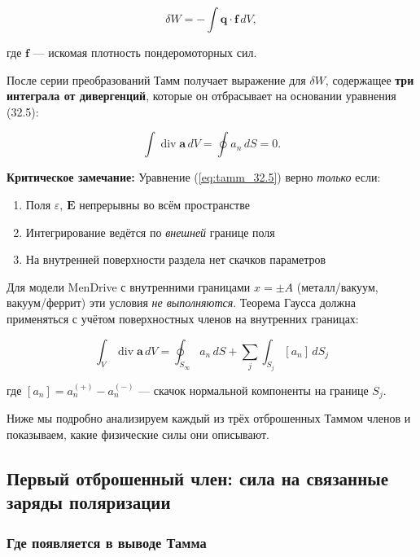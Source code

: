 \documentclass[a4paper,12pt]{article}
\begin{document}
\begin{equation}
\delta W = -\int \mathbf{q}\cdot\mathbf{f}\,dV,
\label{eq:tamm_32.4}
\end{equation}

где $\mathbf{f}$ --- искомая плотность пондеромоторных сил.

После серии преобразований Тамм получает выражение для $\delta W$, содержащее
\textbf{три интеграла от дивергенций}, которые он отбрасывает на основании
уравнения (32.5):

\begin{equation}
\int \operatorname{div}\mathbf{a}\,dV = \oint a_n\,dS = 0.
\label{eq:tamm_32.5}
\end{equation}

\textbf{Критическое замечание:} Уравнение (\ref{eq:tamm_32.5}) верно
\textit{только} если:
\begin{enumerate}
    \item Поля $\varepsilon$, $\mathbf{E}$ непрерывны во всём пространстве
    \item Интегрирование ведётся по \textit{внешней} границе поля
    \item На внутренней поверхности раздела нет скачков параметров
\end{enumerate}

Для модели MenDrive с внутренними границами $x = \pm A$ (металл/вакуум,
вакуум/феррит) эти условия \textit{не выполняются}. Теорема Гаусса должна
применяться с учётом поверхностных членов на внутренних границах:

\begin{equation}
\boxed{
\int_V \operatorname{div}\mathbf{a}\,dV =
\oint_{S_\infty} a_n\,dS +
\sum_j \int_{S_j} [a_n]\,dS_j
}
\label{eq:gauss_discontinuous}
\end{equation}

где $[a_n] = a_n^{(+)} - a_n^{(-)}$ --- скачок нормальной компоненты на
границе $S_j$.

Ниже мы подробно анализируем каждый из трёх отброшенных Таммом членов и
показываем, какие физические силы они описывают.

\subsection{Первый отброшенный член: сила на связанные заряды поляризации}

\subsubsection{Где появляется в выводе Тамма}
\end{document}
